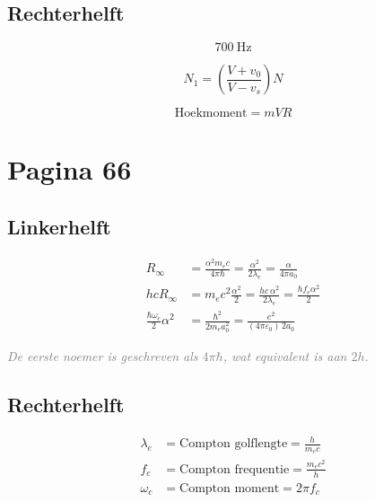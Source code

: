 \documentclass[11pt,a4paper]{article}
\newcommand{\uncertain}[1]{\textit{\textcolor{gray}{#1}}}
\begin{document}
\hfill
\begin{minipage}[t]{0.48\textwidth}
\subsection*{Rechterhelft}

\[
700\ \text{Hz}
\]

\begin{center}
\end{center}

\[
N_1 = \left(\frac{V+v_0}{V-v_s}\right)N
\]

\[
\text{Hoekmoment} = mVR
\]
\end{minipage}

\clearpage
\section*{Pagina 66}

\begin{minipage}[t]{0.48\textwidth}
\subsection*{Linkerhelft}

\begin{align*}
R_\infty
&=
\frac{\alpha^2 m_e c}{4\pi \hbar}
=
\frac{\alpha^2}{2\lambda_e}
=
\frac{\alpha}{4\pi a_0}
\\[0.5em]
hcR_\infty
&=
m_e c^2\frac{\alpha^2}{2}
=
\frac{hc\,\alpha^2}{2\lambda_e}
=
\frac{h f_c \alpha^2}{2}
\\[0.5em]
\frac{\hbar\omega_c}{2}\alpha^2
&=
\frac{\hbar^2}{2m_e a_0^2}
=
\frac{e^2}{(4\pi\varepsilon_0)\,2a_0}
\end{align*}

\uncertain{De eerste noemer is geschreven als $4\pi\hbar$, wat equivalent is aan $2h$.}
\end{minipage}
\hfill
\begin{minipage}[t]{0.48\textwidth}
\subsection*{Rechterhelft}

\begin{align*}
\lambda_e &= \text{Compton golflengte}
= \frac{h}{m_e c}
\\[0.4em]
f_c &= \text{Compton frequentie}
= \frac{m_e c^2}{h}
\\[0.4em]
\omega_c &= \text{Compton moment}
= 2\pi f_c
\end{align*}
\end{minipage}
\end{document}
